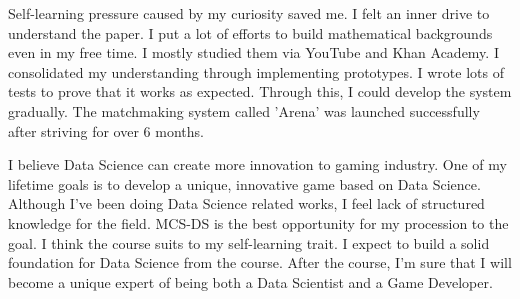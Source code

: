 \documentclass[11pt]{article}
\begin{document}
Self-learning pressure caused by my curiosity saved me.
I felt an inner drive to understand the paper.
I put a lot of efforts to build mathematical backgrounds even in my free time.
I mostly studied them via YouTube and Khan Academy.
I consolidated my understanding through implementing prototypes.
I wrote lots of tests to prove that it works as expected.
Through this, I could develop the system gradually.
The matchmaking system called 'Arena' was launched successfully after striving for over 6 months. 

I believe Data Science can create more innovation to gaming industry.
One of my lifetime goals is to develop a unique, innovative game based on Data Science.
Although I've been doing Data Science related works, I feel lack of structured knowledge for the field.
MCS-DS is the best opportunity for my procession to the goal.
I think the course suits to my self-learning trait. I expect to build a solid foundation for Data Science from the course.
After the course, I'm sure that I will become a unique expert of being both a Data Scientist and a Game Developer.
\end{document}
